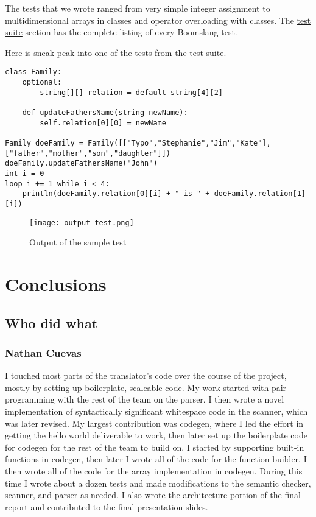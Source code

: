 \documentclass{article}
\begin{document}
The tests that we wrote ranged from very simple integer assignment to multidimensional arrays in classes and operator overloading with classes. The \hyperref[sec:testsuite]{test suite} section has the complete listing of every Boomslang test.

Here is sneak peak into one of the tests from the test suite.

\begin{verbatim}
class Family:
	optional:
		string[][] relation = default string[4][2]

	def updateFathersName(string newName):
		self.relation[0][0] = newName

Family doeFamily = Family([["Typo","Stephanie","Jim","Kate"], ["father","mother","son","daughter"]])
doeFamily.updateFathersName("John")
int i = 0
loop i += 1 while i < 4:
	println(doeFamily.relation[0][i] + " is " + doeFamily.relation[1][i])
\end{verbatim}

\begin{figure}[h]
\caption{Output of the sample test}
\centering
\texttt{[image: output\_test.png]}
\label{fig:sast}
\end{figure}

\section{Conclusions}
\subsection{Who did what}
\subsubsection{Nathan Cuevas}
I touched most parts of the translator's code over the course of the project, mostly by setting up boilerplate, scaleable code. My work started with pair programming with the rest of the team on the parser. I then wrote a novel implementation of syntactically significant whitespace code in the scanner, which was later revised. My largest contribution was codegen, where I led the effort in getting the hello world deliverable to work, then later set up the boilerplate code for codegen for the rest of the team to build on. I started by supporting built-in functions in codegen, then later I wrote all of the code for the function builder. I then wrote all of the code for the array implementation in codegen. During this time I wrote about a dozen tests and made modifications to the semantic checker, scanner, and parser as needed. I also wrote the architecture portion of the final report and contributed to the final presentation slides.
\end{document}
